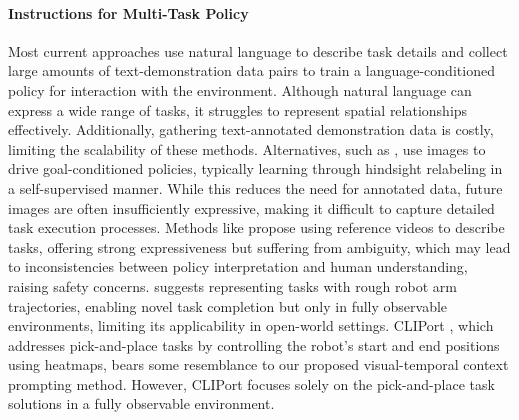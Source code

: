 \documentclass[11pt, a4paper, logo, two column]{craftjarvis}
\begin{document}
\paragraph{Instructions for Multi-Task Policy} 
Most current approaches \citep{rt-1, rt-2, language_table, worldmc, leo} use natural language to describe task details and collect large amounts of text-demonstration data pairs to train a language-conditioned policy for interaction with the environment. Although natural language can express a wide range of tasks, it struggles to represent spatial relationships effectively. Additionally, gathering text-annotated demonstration data is costly, limiting the scalability of these methods. Alternatives, such as \cite{steve1, zson, rt-sketch}, use images to drive goal-conditioned policies, typically learning through hindsight relabeling in a self-supervised manner. While this reduces the need for annotated data, future images are often insufficiently expressive, making it difficult to capture detailed task execution processes. Methods like \cite{groot1, bcz} propose using reference videos to describe tasks, offering strong expressiveness but suffering from ambiguity, which may lead to inconsistencies between policy interpretation and human understanding, raising safety concerns. \cite{rt-trajectory} suggests representing tasks with rough robot arm trajectories, enabling novel task completion but only in fully observable environments, limiting its applicability in open-world settings. CLIPort \citep{cliport}, which addresses pick-and-place tasks by controlling the robot’s start and end positions using heatmaps, bears some resemblance to our proposed visual-temporal context prompting method. However, CLIPort focuses solely on the pick-and-place task solutions in a fully observable environment. 
\end{document}
